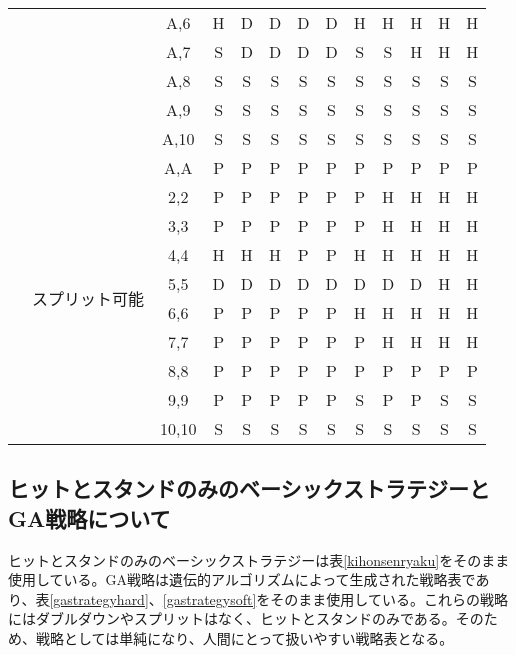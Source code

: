 \begin{table}[H]
\begin{center}
\begin{tabular}{|c|c|c|c|c|c|c|c|c|c|c|c|c|}
                            &                           & A,6   & H & D & D & D & D & H & H & H & H  & H \\ \cline{3-13} 
                            &                           & A,7   & S & D & D & D & D & S & S & H & H  & H \\ \cline{3-13} 
                            &                           & A,8   & S & S & S & S & S & S & S & S & S  & S \\ \cline{3-13} 
                            &                           & A,9   & S & S & S & S & S & S & S & S & S  & S \\ \cline{3-13} 
                            &                           & A,10  & S & S & S & S & S & S & S & S & S  & S \\ \cline{2-13} 
                            & \multirow{10}{*}{スプリット可能} & A,A   & P & P & P & P & P & P & P & P & P  & P \\ \cline{3-13} 
                            &                           & 2,2   & P & P & P & P & P & P & H & H & H  & H \\ \cline{3-13} 
                            &                           & 3,3   & P & P & P & P & P & P & H & H & H  & H \\ \cline{3-13} 
                            &                           & 4,4   & H & H & H & P & P & H & H & H & H  & H \\ \cline{3-13} 
                            &                           & 5,5   & D & D & D & D & D & D & D & D & H  & H \\ \cline{3-13} 
                            &                           & 6,6   & P & P & P & P & P & H & H & H & H  & H \\ \cline{3-13} 
                            &                           & 7,7   & P & P & P & P & P & P & H & H & H  & H \\ \cline{3-13} 
                            &                           & 8,8   & P & P & P & P & P & P & P & P & P  & P \\ \cline{3-13} 
                            &                           & 9,9   & P & P & P & P & P & S & P & P & S  & S \\ \cline{3-13} 
                            &                           & 10,10 & S & S & S & S & S & S & S & S & S  & S \\ \hline
    \end{tabular}
    \end{center}
\end{table}




\subsection{ヒットとスタンドのみのベーシックストラテジーとGA戦略について}

ヒットとスタンドのみのベーシックストラテジーは表\ref{kihonsenryaku}をそのまま使用している。GA戦略は遺伝的アルゴリズムによって生成された戦略表であり、表\ref{gastrategyhard}、\ref{gastrategysoft}をそのまま使用している。これらの戦略にはダブルダウンやスプリットはなく、ヒットとスタンドのみである。そのため、戦略としては単純になり、人間にとって扱いやすい戦略表となる。

